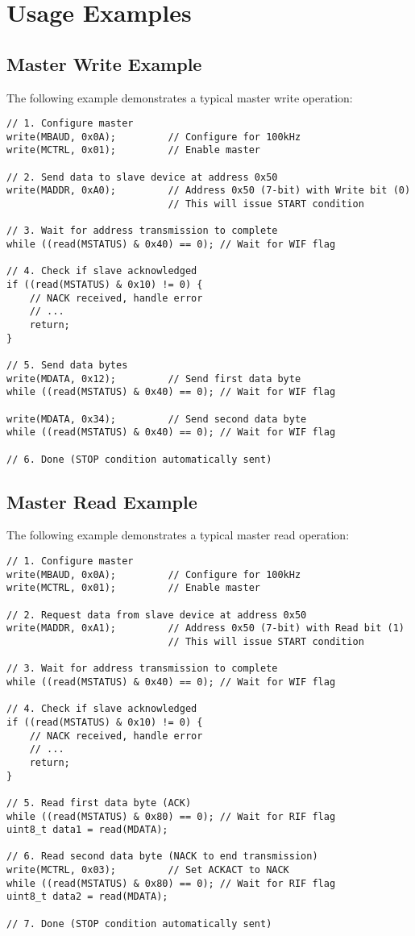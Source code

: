 \section{Usage Examples}

\subsection{Master Write Example}
The following example demonstrates a typical master write operation:

\begin{verbatim}
// 1. Configure master
write(MBAUD, 0x0A);         // Configure for 100kHz
write(MCTRL, 0x01);         // Enable master

// 2. Send data to slave device at address 0x50
write(MADDR, 0xA0);         // Address 0x50 (7-bit) with Write bit (0)
                            // This will issue START condition

// 3. Wait for address transmission to complete
while ((read(MSTATUS) & 0x40) == 0); // Wait for WIF flag

// 4. Check if slave acknowledged
if ((read(MSTATUS) & 0x10) != 0) {
    // NACK received, handle error
    // ...
    return;
}

// 5. Send data bytes
write(MDATA, 0x12);         // Send first data byte
while ((read(MSTATUS) & 0x40) == 0); // Wait for WIF flag

write(MDATA, 0x34);         // Send second data byte
while ((read(MSTATUS) & 0x40) == 0); // Wait for WIF flag

// 6. Done (STOP condition automatically sent)
\end{verbatim}

\subsection{Master Read Example}
The following example demonstrates a typical master read operation:

\begin{verbatim}
// 1. Configure master
write(MBAUD, 0x0A);         // Configure for 100kHz
write(MCTRL, 0x01);         // Enable master

// 2. Request data from slave device at address 0x50
write(MADDR, 0xA1);         // Address 0x50 (7-bit) with Read bit (1)
                            // This will issue START condition

// 3. Wait for address transmission to complete
while ((read(MSTATUS) & 0x40) == 0); // Wait for WIF flag

// 4. Check if slave acknowledged
if ((read(MSTATUS) & 0x10) != 0) {
    // NACK received, handle error
    // ...
    return;
}

// 5. Read first data byte (ACK)
while ((read(MSTATUS) & 0x80) == 0); // Wait for RIF flag
uint8_t data1 = read(MDATA);

// 6. Read second data byte (NACK to end transmission)
write(MCTRL, 0x03);         // Set ACKACT to NACK
while ((read(MSTATUS) & 0x80) == 0); // Wait for RIF flag
uint8_t data2 = read(MDATA);

// 7. Done (STOP condition automatically sent)
\end{verbatim}

